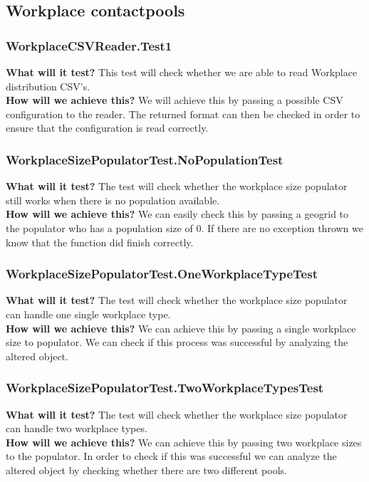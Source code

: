 \documentclass{article}
\begin{document}
\subsection{Workplace contactpools}

\subsubsection{WorkplaceCSVReader.Test1}
\textbf{What will it test?}
This test will check whether we are able to read Workplace distribution CSV's.\\
\newline
\textbf{How will we achieve this?}
We will achieve this by passing a possible CSV configuration to the reader. The returned format can then be checked in order to ensure that the configuration is read correctly.

\subsubsection{WorkplaceSizePopulatorTest.NoPopulationTest}
\textbf{What will it test?}
The test will check whether the workplace size populator still works when there is no population available.\\
\newline
\textbf{How will we achieve this?}
We can easily check this by passing a geogrid to the populator who has a population size of 0. If there are no exception thrown we know that the function did finish correctly.

\subsubsection{WorkplaceSizePopulatorTest.OneWorkplaceTypeTest}
\textbf{What will it test?}
The test will check whether the workplace size populator can handle one single workplace type.\\
\newline
\textbf{How will we achieve this?}
We can achieve this by passing a single workplace size to populator. We can check if this process was successful by analyzing the altered object.

\subsubsection{WorkplaceSizePopulatorTest.TwoWorkplaceTypesTest}
\textbf{What will it test?}
The test will check whether the workplace size populator can handle two workplace types.\\
\newline
\textbf{How will we achieve this?} 
We can achieve this by passing two workplace sizes to the populator. In order to check if this was successful we can analyze the altered object by checking whether there are two different pools.
\end{document}

